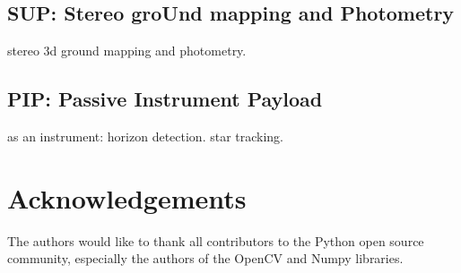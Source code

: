 \documentclass[conference]{IEEEtran} %
\begin{document}
\subsection{SUP: Stereo groUnd mapping and Photometry}
stereo 3d ground mapping and photometry.

\subsection{PIP: Passive Instrument Payload}
as an instrument: horizon detection. star tracking.

\section*{Acknowledgements}
The authors would like to thank all contributors to the Python open source community, especially the authors of the OpenCV and Numpy libraries.




\onecolumn
\appendices{}
\end{document}
